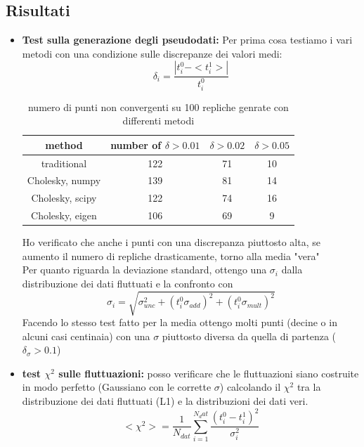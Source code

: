 \documentclass{article}
\begin{document}
\subsection{Risultati}
\begin{itemize}
    \item \textbf{Test sulla generazione degli pseudodati: } Per prima cosa testiamo i vari metodi con una condizione sulle discrepanze dei valori medi:
    \[ \delta_i = \frac{| t_i^0 - <t_i^1>|}{t_i^0} \]
    \begin{table}[h]
    \caption{numero di punti non convergenti su 100 repliche genrate con differenti metodi}
    \label{tab:Distanza dal punto medio}
    \centering
    \begin{adjustbox}{width=\textwidth}
        \begin{tabular}{|c|c|c|c|}
        \hline
        \textbf{method} & \textbf{number of $\delta > 0.01$} & \textbf{$\delta > 0.02$} & \textbf{$\delta > 0.05$}\\
        \hline
        traditional  & 122 & 71 &  10 \\
        Cholesky, numpy & 139 & 81 & 14  \\
        Cholesky, scipy & 122 & 74 & 16 \\
        Cholesky, eigen & 106 & 69 & 9 \\
        \hline
    \end{tabular}
\end{adjustbox}
\end{table}
    Ho verificato che anche i punti con una discrepanza piuttosto alta, se aumento il numero di repliche drasticamente, torno alla media "vera" \\
    Per quanto riguarda la deviazione standard, ottengo una $\sigma_i$ dalla distribuzione dei dati fluttuati e la confronto con
    \[ \sigma_i = \sqrt{\sigma_{unc}^2 + (t_i^0 \sigma_{add})^2 + (t_i^0 \sigma_{mult})^2 }\]
    Facendo lo stesso test fatto per la media ottengo molti punti (decine o in alcuni casi centinaia) con una $\sigma$ piuttosto diversa da quella di partenza ($\delta_{\sigma} > 0.1$)
    \item \textbf{test $\chi^2$ sulle fluttuazioni: } posso verificare che le fluttuazioni siano costruite in modo perfetto (Gaussiano con le corrette $\sigma$) calcolando il $\chi^2$ tra la distribuzione dei dati fluttuati (L1) e la distribuzioni dei dati veri.
    \[ <\chi^2> = \frac{1}{N_{dat}} \sum_{i=1}^{N_dat}\frac{(t_i^0 - t_i^1)^2}{\sigma_i^2} \]


\end{itemize}
\end{document}
